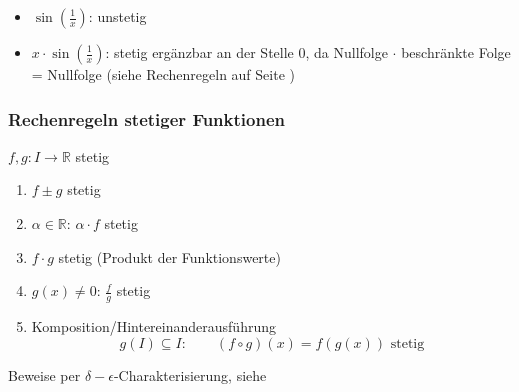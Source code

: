 \begin{example}
  \begin{center}
  \begin{itemize}
   \item $\sin(\frac 1 x)$: unstetig


   \item $x \cdot \sin(\frac 1 x)$: stetig ergänzbar an der Stelle 0, da Nullfolge $\cdot$ beschränkte Folge = Nullfolge (siehe Rechenregeln auf Seite \pageref{ssub:nullfolgen})

  \end{itemize}
  \end{center}
\end{example}

\subsubsection*{Rechenregeln stetiger Funktionen}

$f, g: I \to \mathbb{R}$ stetig

\begin{enumerate}
  \item $f\pm g$ stetig
  \item $\alpha \in \mathbb{R}$: $\alpha \cdot f$ stetig
  \item $f \cdot g$ stetig (Produkt der Funktionswerte)
  \item $g(x) \neq 0$: $\frac f g$ stetig
  \item Komposition/Hintereinanderausführung
    \begin{equation*}
      g(I) \subseteq I: \qquad (f \circ g)(x) = f(g(x)) \text{ stetig}
    \end{equation*}
\end{enumerate}
%
Beweise per $\delta-\epsilon$-Charakterisierung, siehe \cite{bornemann}

